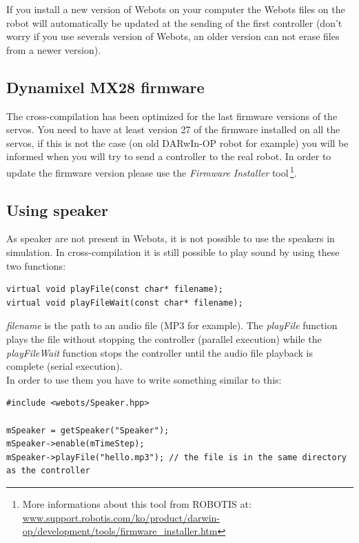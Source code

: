 \documentclass[a4paper, 12pt]{article}  		%
\begin{document}
If you install a new version of Webots on your computer the Webots files on the robot will automatically be updated at the sending of the first controller (don't worry if you use severals version of Webots, an older version can not erase files from a newer version).\\

\subsection{Dynamixel MX28 firmware}
The cross-compilation has been optimized for the last firmware versions of the servos. You need to have at least version 27 of the firmware installed on all the servos, if this is not the case (on old DARwIn-OP robot for example) you will be informed when you will try to send a controller to the real robot. In order to update the firmware version please use the \textit{Firmware Installer} tool\,\footnote{ More informations about this tool from ROBOTIS at: \url{www.support.robotis.com/ko/product/darwin-op/development/tools/firmware_installer.htm}}.\\

\newpage
\subsection{Using speaker}
As speaker are not present in Webots, it is not possible to use the speakers in simulation. In cross-compilation it is still possible to play sound by using these two functions:\\
\lstset{language=c++} 
\lstset{commentstyle=\textit} 
\begin{lstlisting} 
virtual void playFile(const char* filename);
virtual void playFileWait(const char* filename);
\end{lstlisting}
\textit{filename} is the path to an audio file (MP3 for example). The \textit{playFile} function plays the file without stopping the controller (parallel execution) while the \textit{playFileWait} function stops the controller until the audio file playback is complete (serial execution).\\

In order to use them you have to write something similar to this:\\
\lstset{language=c++} 
\lstset{commentstyle=\textit} 
\begin{lstlisting} 
#include <webots/Speaker.hpp>

mSpeaker = getSpeaker("Speaker");
mSpeaker->enable(mTimeStep);
mSpeaker->playFile("hello.mp3"); // the file is in the same directory as the controller
\end{lstlisting}
\end{document}
